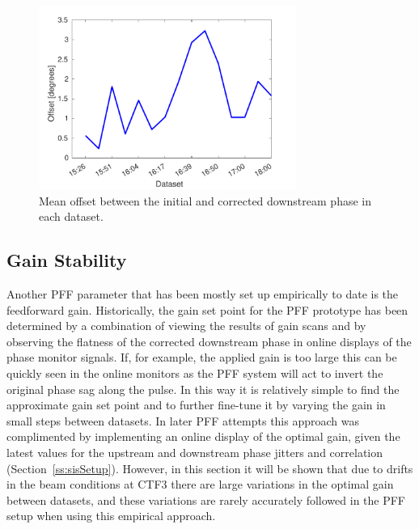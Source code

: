 \begin{figure}
  \centering
  \includegraphics[width=0.75\textwidth]{Figures/feedforward/longFF_phaseOffset}
  \caption{Mean offset between the initial and corrected downstream phase in each dataset.}
  \label{f:longFF_phaseOffset}
\end{figure}

\subsection{Gain Stability}
\label{ss:longFF_gain}

Another PFF parameter that has been mostly set up empirically to date is the feedforward gain. Historically, the gain set point for the PFF prototype has been determined by a combination of viewing the results of gain scans %
and by observing the flatness of the corrected downstream phase in online displays of the phase monitor signals. If, for example, the applied gain is too large this can be quickly seen in the online monitors as the PFF system will act to invert the original phase sag along the pulse. In this way it is relatively simple to find the approximate gain set point and to further fine-tune it by varying the gain in small steps between datasets. In later PFF attempts this approach was complimented by implementing an online display of the optimal gain, given the latest values for the upstream and downstream phase jitters and correlation (Section~\ref{ss:sisSetup}). However, in this section it will be shown that due to drifts in the beam conditions at CTF3 there are large variations in the optimal gain between datasets, and these variations are rarely accurately followed in the PFF setup when using this empirical approach.

